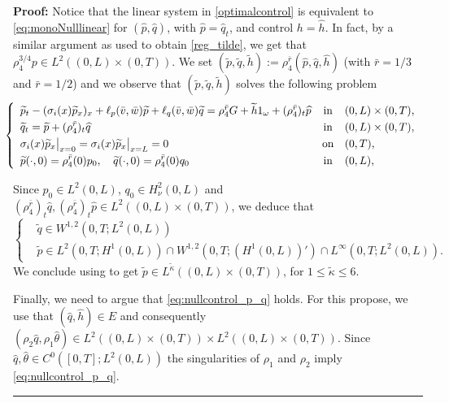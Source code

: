 \documentclass[10pt]{article}
\newenvironment{proof}[1][Proof]
{\noindent\textbf{#1:} }{\hfill\rule{0.5em}{0.5em}}
\def\dis{\displaystyle}
\def\\Phivec{\mathbf{\Phi}}
\begin{document}
\begin{proof}
	Notice that the linear system in \eqref{optimalcontrol} is equivalent to \eqref{eq:monoNulllinear} for $(\widehat p,\widehat q)$,
	with $\widehat p=\widehat q_t$,
	and control $h =\widehat{h}$. In fact, by a similar argument as used to obtain \eqref{reg_tilde},
	we get that $\rho_4^{3/4}p\in L^2((0,L)\times(0,T))$.
	We set $(\widetilde p,\widetilde q,\widetilde h):=\rho_4^{\bar r}( \widehat p, \widehat q, \widehat h)$ (with $\bar r=1/3$ and $\bar r=1/2$) and
		we observe that $(\widetilde p,\widetilde q,\widetilde h)$ solves the following problem
\begin{equation}\label{eq:monoNulllineartildep}
    \!\!\!\!\!\left\{
        \begin{array}{lcl}
        \widetilde p_t-(\sigma_i(x) \widetilde p_x)_x +\ell_p(\bar v,\bar w)\widetilde p+ \ell_q(\bar v,\bar w) \widetilde q
         = \rho_4^{\bar r} G+\widetilde h1_{\omega} +(\rho_4^{\bar r})_{t}\widehat p        &  \mbox{in}&    (0,L) \times (0,T),        \\
            \noalign{\smallskip}\dis
            \widetilde q_t  =   \widetilde p+(\rho_4^{\bar r})_{t}\widehat q                    &  \mbox{in}& (0,L) \times (0,T),        \\
            \noalign{\smallskip}\dis
            \sigma_i(x)\widetilde p_x\big|_{x=0}=\sigma_i(x)\widetilde p_x\big|_{x=L} = 0                & \mbox{on}& (0,T),    \\
            \noalign{\smallskip}\dis
            \widetilde p(\cdot,0) =\rho_4^{\bar r}(0)p_0,\quad \widetilde q(\cdot,0) =\rho_4^{\bar r} (0)q_0         & \mbox{in}&    (0,L),
        \end{array}
    \right.
\end{equation}
	
		Since $p_0\in L^2(0,L)$, $ q_0\in H^2_\nu(0,L)$ and
		$(\rho_4^{\bar r})_{t} \widehat q, (\rho_4^{\bar r})_{t}\widehat p\in L^2((0,L)\times(0,T))$,
		we deduce that
\begin{equation}\label{reg_tilde1}
\left\{
	\begin{alignedat}{2}
		&\widetilde q\in W^{1,2}(0,T;L^2(0,L))\\
		&\widetilde p \in L^2(0,T;H^1(0,L))\cap W^{1,2}(0,T;(H^1(0,L))')\cap L^\infty(0,T;L^2(0,L)).
	\end{alignedat}
	\right.
\end{equation}	
	We conclude using \cite[Chapter II. $\S3$]{Lady} to get  $\widetilde p\in L^{\tilde\kappa}((0,L)\times (0,T))$, for $1\leq {\tilde\kappa}\leq 6$.
	
	Finally, we need to argue that \eqref{eq:nullcontrol_p_q} holds. For this propose, we use that $(\widehat q,\widehat h)\in E$
	and consequently $(\rho_2\widehat q,\rho_1\widehat \theta)\in L^2((0,L)\times(0,T))\times L^2((0,L)\times(0,T))$.
	Since $\widehat q,\widehat \theta\in C^0([0,T];L^2(0,L))$ the singularities of $\rho_1$ and $\rho_2$
	imply \eqref{eq:nullcontrol_p_q}.
\end{proof}
\end{document}
